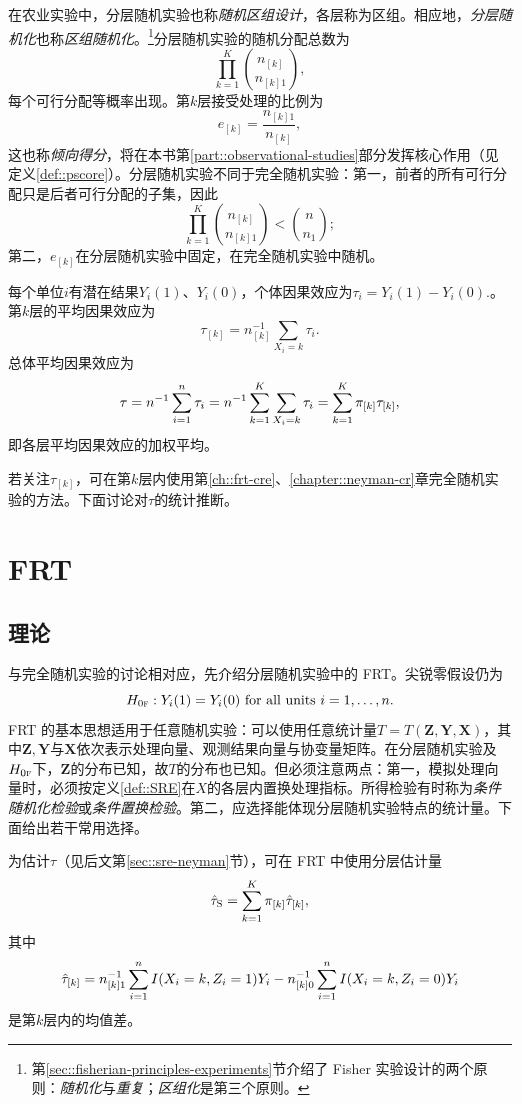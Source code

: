 在农业实验中，分层随机实验也称{\it 随机区组设计}，各层称为区组。相应地，{\it 分层随机化}也称{\it 区组随机化}。\footnote{第\ref{sec::fisherian-principles-experiments}节介绍了 Fisher 实验设计的两个原则：{\it 随机化}与{\it 重复}；{\it 区组化}是第三个原则。}分层随机实验的随机分配总数为
$$
\prod_{k=1}^K  \binom{  n_{[k]} }{  n_{[k]1} } ,
$$
每个可行分配等概率出现。第$k$层接受处理的比例为
$$
e_{[k]} = \frac{n_{[k]1}}{n_{[k]}},
$$
这也称{\it 倾向得分}，将在本书第\ref{part::observational-studies}部分发挥核心作用（见定义\ref{def::pscore}）。分层随机实验不同于完全随机实验：第一，前者的所有可行分配只是后者可行分配的子集，因此
$$
\prod_{k=1}^K  \binom{  n_{[k]} }{  n_{[k]1} } < 
\binom{n}{n_1} ;
$$
第二，$e_{[k]} $在分层随机实验中固定，在完全随机实验中随机。  


每个单位$i$有潜在结果$Y_i(1)$、$Y_i(0)$，个体因果效应为$\tau_i = Y_i(1) - Y_i(0) . $。第$k$层的平均因果效应为
$$
\tau_{[k]} = n_{[k]}^{-1} \sum_{X_i   = k} \tau_i .
$$
总体平均因果效应为
$$
\tau = n^{-1} \sum_{i=1}^n \tau_i = n^{-1} \sum_{k=1}^K \sum_{X_i   = k} \tau_i =  \sum_{k=1}^K  \pi_{[k]}  \tau_{[k]},
$$
即各层平均因果效应的加权平均。 


若关注$\tau_{[k]} $，可在第$k$层内使用第\ref{ch::frt-cre}、\ref{chapter::neyman-cr}章完全随机实验的方法。下面讨论对$\tau$的统计推断。 


\section{FRT}
\label{sec::sre-frt}


\subsection{理论}与完全随机实验的讨论相对应，先介绍分层随机实验中的 FRT。尖锐零假设仍为
$$
H_{0\textsc{f}}: Y_i(1) = Y_i(0) \text{ for all units } i=1, \ldots, n.
$$
FRT 的基本思想适用于任意随机实验：可以使用任意统计量$T = T(\bm{Z}, \bm{Y}, \bm{X})$，其中$\bm{Z}, \bm{Y}$与$\bm{X}$依次表示处理向量、观测结果向量与协变量矩阵。在分层随机实验及$H_{0\textsc{f}}$下，$\bm{Z}$的分布已知，故$T$的分布也已知。但必须注意两点：第一，模拟处理向量时，必须按定义\ref{def::SRE}在$X$的各层内置换处理指标。所得检验有时称为{\it 条件随机化检验}或{\it 条件置换检验}。第二，应选择能体现分层随机实验特点的统计量。下面给出若干常用选择。

\begin{example}[分层差异估计量]
\label{eg::stratifiedestimator}
为估计$\tau$（见后文第\ref{sec::sre-neyman}节），可在 FRT 中使用分层估计量
$$
\hat{\tau}_\textsc{S} = \sum_{k=1}^K  \pi_{[k]} \hat{\tau}_{[k]},
$$
其中
$$
\hat{\tau}_{[k]} = n_{[k]1}^{-1} \sum_{i=1}^n I(X_i  =k, Z_i=1) Y_i - n_{[k]0}^{-1} \sum_{i=1}^n I(X_i  =k, Z_i=0) Y_i 
$$
是第$k$层内的均值差。 
\end{example}




